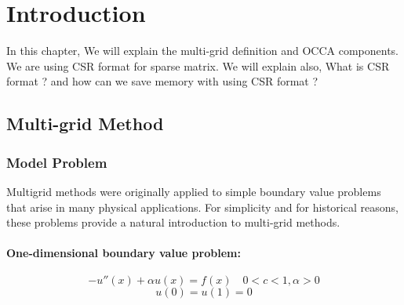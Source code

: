 \chapter{Introduction}
In this chapter, We will explain the multi-grid definition and OCCA components. We are using CSR format for sparse matrix. We will explain also, What is CSR format ? and how can we save memory with using CSR format ?


\section{Multi-grid Method}
\subsection{Model Problem}
Multigrid methods were originally applied to simple boundary value problems that arise in many physical applications. For simplicity and for historical reasons, these problems provide a natural introduction to multi-grid methods.\\

\subsubsection{One-dimensional boundary value problem:}
\begin{equation}
	-u''(x) + \alpha u(x) = f(x)  \quad 0<c<1, \alpha > 0 
\end{equation}
\begin{equation}
	u(0) = u(1) = 0
\end{equation}

